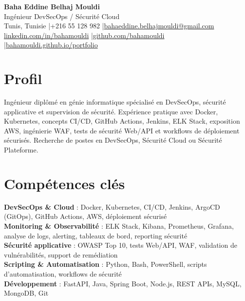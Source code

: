 \documentclass[a4paper,10pt]{article}
\begin{document}
\begin{center}
{\LARGE\bfseries\color{navy} Baha Eddine Belhaj Mouldi}\\[4pt]
{\large Ingénieur DevSecOps / Sécurité Cloud}\\[6pt]
Tunis, Tunisie \quad|\quad +216 55 128 982 \quad|\quad \href{mailto:bahaeddine.belhajmouldi@gmail.com}{bahaeddine.belhajmouldi@gmail.com}\\[2pt]
\href{https://www.linkedin.com/in/bahamouldi}{linkedin.com/in/bahamouldi} \quad|\quad \href{https://github.com/bahamouldi}{github.com/bahamouldi} \quad|\quad \href{https://bahamouldi.github.io/portfolio/}{bahamouldi.github.io/portfolio}
\end{center}
\vspace{3pt}
\section{Profil}
Ingénieur diplômé en génie informatique spécialisé en DevSecOps, sécurité applicative et supervision de sécurité. Expérience pratique avec Docker, Kubernetes, concepts CI/CD, GitHub Actions, Jenkins, ELK Stack, exposition AWS, ingénierie WAF, tests de sécurité Web/API et workflows de déploiement sécurisés. Recherche de postes en DevSecOps, Sécurité Cloud ou Sécurité Plateforme.
\section{Compétences clés}
\textbf{DevSecOps \& Cloud} : Docker, Kubernetes, CI/CD, Jenkins, ArgoCD (GitOps), GitHub Actions, AWS, déploiement sécurisé\\[1pt]
\textbf{Monitoring \& Observabilité} : ELK Stack, Kibana, Prometheus, Grafana, analyse de logs, alerting, tableaux de bord, reporting sécurité\\[1pt]
\textbf{Sécurité applicative} : OWASP Top 10, tests Web/API, WAF, validation de vulnérabilités, support de remédiation\\[1pt]
\textbf{Scripting \& Automatisation} : Python, Bash, PowerShell, scripts d'automatisation, workflows de sécurité\\[1pt]
\textbf{Développement} : FastAPI, Java, Spring Boot, Node.js, REST APIs, MySQL, MongoDB, Git
\end{document}

